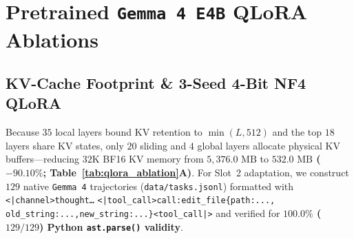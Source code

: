 \documentclass[10pt,twocolumn,letterpaper]{article}
\begin{document}
\section{Pretrained \texttt{Gemma 4 E4B} QLoRA Ablations}
\label{sec:qlora}

\subsection{KV-Cache Footprint \& 3-Seed 4-Bit NF4 QLoRA}
Because $35$ local layers bound KV retention to $\min(L,512)$ and the top $18$ layers share KV states, only $20$ sliding and $4$ global layers allocate physical KV buffers—reducing $32\text{K}$ BF16 KV memory from $5{,}376.0\text{ MB}$ to \textbf{$532.0\text{ MB}$ ($-90.10\%$; Table~\ref{tab:qlora_ablation}A)}. For Slot~2 adaptation, we construct $129$ native \texttt{Gemma 4} trajectories (\texttt{data/tasks.jsonl}) formatted with \texttt{<|channel>thought\dots<channel|>} \allowbreak \texttt{<|tool\_call>call:edit\_file\{path:...,} \allowbreak \texttt{old\_string:...,new\_string:...\}<tool\_call|>} and verified for \textbf{$100.0\%$ ($129/129$) Python \texttt{ast.parse()} validity}.
\end{document}
